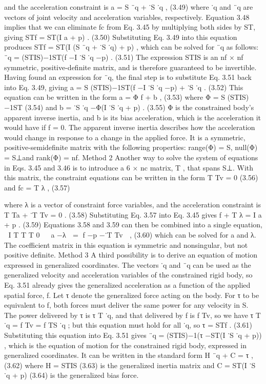 and the acceleration constraint is a = S ¨q + ˙S ˙q , (3.49) where ˙q and ¨q are vectors of joint velocity and acceleration variables, respectively. Equation 3.48 implies that we can eliminate fc from Eq. 3.45 by multiplying both sides by ST, giving STf = ST(I a + p) . (3.50) Substituting Eq. 3.49 into this equation produces STf = ST(I (S ¨q + ˙S ˙q) + p) , which can be solved for ¨q as follows: ¨q = (STIS)−1ST(f −I ˙S ˙q −p) . (3.51) The expression STIS is an nf × nf symmetric, positive-definite matrix, and is therefore guaranteed to be invertible. Having found an expression for ¨q, the final step is to substitute Eq. 3.51 back into Eq. 3.49, giving a = S (STIS)−1ST(f −I ˙S ˙q −p) + ˙S ˙q . (3.52) This equation can be written in the form a = Φ f + b , (3.53) where Φ = S (STIS)−1ST (3.54) and b = ˙S ˙q −Φ(I ˙S ˙q + p) . (3.55) Φ is the constrained body’s apparent inverse inertia, and b is its bias acceleration, which is the acceleration it would have if f = 0. The apparent inverse inertia describes how the acceleration would change in response to a change in the applied force. It is a symmetric, positive-semidefinite matrix with the following properties: range(Φ) = S, null(Φ) = S⊥and rank(Φ) = nf. Method 2 Another way to solve the system of equations in Eqs. 3.45 and 3.46 is to introduce a 6 × nc matrix, T , that spans S⊥. With this matrix, the constraint equations can be written in the form T Tv = 0 (3.56) and fc = T λ , (3.57)

where λ is a vector of constraint force variables, and the acceleration constraint is T Ta + ˙T Tv = 0 . (3.58) Substituting Eq. 3.57 into Eq. 3.45 gives f + T λ = I a + p . (3.59) Equations 3.58 and 3.59 can then be combined into a single equation,  I T T T 0   a −λ  = f −p −˙T Tv  , (3.60) which can be solved for a and λ. The coefficient matrix in this equation is symmetric and nonsingular, but not positive definite. Method 3 A third possibility is to derive an equation of motion expressed in generalized coordinates. The vectors ˙q and ¨q can be used as the generalized velocity and acceleration variables of the constrained rigid body, so Eq. 3.51 already gives the generalized acceleration as a function of the applied spatial force, f. Let τ denote the generalized force acting on the body. For τ to be equivalent to f, both forces must deliver the same power for any velocity in S. The power delivered by τ is τ T ˙q, and that delivered by f is f Tv, so we have τ T ˙q = f Tv = f TS ˙q ; but this equation must hold for all ˙q, so τ = STf . (3.61) Substituting this equation into Eq. 3.51 gives ¨q = (STIS)−1(τ −ST(I ˙S ˙q + p)) , which is the equation of motion for the constrained rigid body, expressed in generalized coordinates. It can be written in the standard form H ¨q + C = τ , (3.62) where H = STIS (3.63) is the generalized inertia matrix and C = ST(I ˙S ˙q + p) (3.64) is the generalized bias force.

